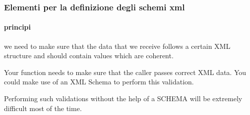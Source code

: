 







\begin{frame}
    \frametitle{Elementi per la definizione degli schemi xml}
    \framesubtitle{principi}
    \addtocounter{nframe}{1}

    we need to make sure that the data that we receive follows a certain XML structure and should contain values which are coherent. 

    Your function needs to make sure that the caller passes correct XML data. You could make use of an XML Schema to perform this validation.

    Performing such validations without the help of a SCHEMA will be extremely difficult most of the time.


\end{frame}

